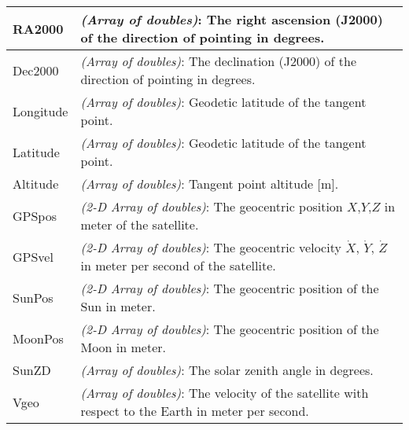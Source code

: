 \begin{longtable}{| p{} | p{} |}
     RA2000          & \emph{(Array of doubles)}: The right ascension (J2000) of the direction of pointing in degrees. \\ \hline
     Dec2000         & \emph{(Array of doubles)}: The declination (J2000) of the direction of pointing in degrees. \\ \hline
     Longitude       & \emph{(Array of doubles)}: Geodetic latitude of the tangent point.\\ \hline
     Latitude        & \emph{(Array of doubles)}: Geodetic latitude of the tangent point.\\ \hline
     Altitude        & \emph{(Array of doubles)}: Tangent point altitude [m].\\ \hline
     GPSpos          & \emph{(2-D Array of doubles)}: The geocentric position $X$,$Y$,$Z$ in meter of the satellite.\\ \hline
     GPSvel          & \emph{(2-D Array of doubles)}: The geocentric velocity $\dot X$, $\dot Y$, $\dot Z$ in meter per 
                         second of the satellite.\\ \hline
     SunPos          & \emph{(2-D Array of doubles)}: The geocentric position of the Sun in meter.\\ \hline
     MoonPos         & \emph{(2-D Array of doubles)}: The geocentric position of the Moon in meter.\\ \hline
     SunZD           & \emph{(Array of doubles)}: The solar zenith angle in degrees. \\ \hline
     Vgeo            & \emph{(Array of doubles)}: The velocity of the satellite with respect to the Earth in meter per second.\\ \hline

\end{longtable}
